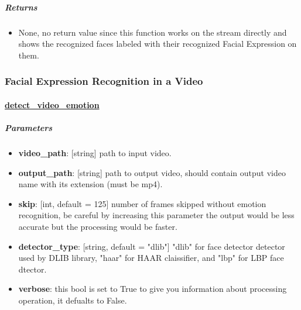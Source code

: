 \subparagraph{Returns}
\begin{changemargin}{0.5cm}{0cm}
\begin{itemize}[noitemsep,nolistsep]
	\item None, no return value since this function works on the stream directly and shows the recognized faces labeled with their recognized Facial Expression on them.
\end{itemize}
\end{changemargin}
	
\begin{comment}
\subparagraph{Usage}:
\begin{changemargin}{0.5cm}{0cm}
\begin{itemize}
	\item import the module:
	\begin{lstlisting}[language=Python]
	from Cerebro.interface Import video_stream as vs\end{lstlisting}
	\item call it:
	\begin{lstlisting}[language=Python]
	vs.detect_stream_emotions(skip)\end{lstlisting}
\end{itemize}
\end{changemargin}
\end{comment}
\newpage

\subsubsection{Facial Expression Recognition in a Video}
\paragraph{\underline{detect\_video\_emotion}}
\subparagraph{Parameters}
\begin{changemargin}{0.5cm}{0cm} 
	\begin{itemize}
		\item  \textbf{video\_path}: [string] path to input video.
		\item  \textbf{output\_path}: [string] path to output video, should contain output video name with its extension (must be mp4).
		\item  \textbf{skip}: [int, default = 125] number of frames skipped without emotion recognition, be careful by increasing this parameter the output would be less accurate but the processing would be faster.
		\item \textbf{detector\_type}: [string, default = "dlib"] "dlib" for face detector detector used by DLIB library, "haar" for HAAR claissifier, and "lbp" for LBP face dtector.
		\item  \textbf{verbose}: this bool is set to True to give you information about processing operation, it defualts to False.
	\end{itemize}
\end{changemargin}


